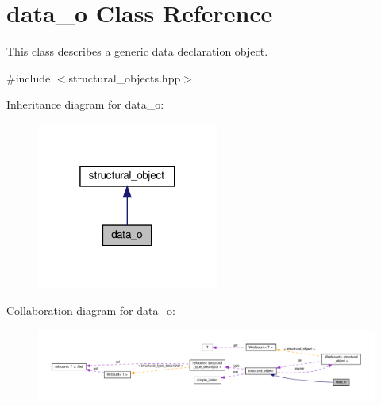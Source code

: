 \hypertarget{classdata__o}{}\section{data\+\_\+o Class Reference}
\label{classdata__o}


This class describes a generic data declaration object.  




{\ttfamily \#include $<$structural\+\_\+objects.\+hpp$>$}



Inheritance diagram for data\+\_\+o\+:
\nopagebreak
\begin{figure}[H]
\begin{center}
\leavevmode
\includegraphics[width=169pt]{d5/d44/classdata__o__inherit__graph}
\end{center}
\end{figure}


Collaboration diagram for data\+\_\+o\+:
\nopagebreak
\begin{figure}[H]
\begin{center}
\leavevmode
\includegraphics[width=350pt]{d6/d06/classdata__o__coll__graph}
\end{center}
\end{figure}
